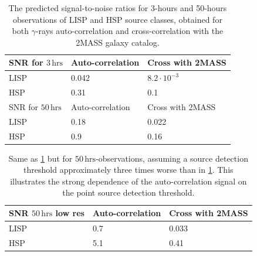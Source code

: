 \documentclass[aps,prd,a4paper,reprint,nofootinbib,superscriptaddress,floatfix,preprintnumbers]{revtex4-2}
\begin{document}
\begin{table}[t!]
\centering
\begin{tabular}{m{}  m{}  m{}} 
 \hline
 SNR for $3\,\mathrm{hrs}$ & Auto-correlation & Cross with 2MASS \\ [0.5ex]
 \hline
 LISP &  0.042 &   $8.2\cdot 10^{-3}$ \\ [0.5ex]
 HSP &  0.31 &  0.1 \\  [1.5ex]
 \hline \hline
  SNR for $50\,\mathrm{hrs}$ & Auto-correlation & Cross with 2MASS \\ [0.5ex]
 \hline
 LISP &  0.18 &  0.022 \\ [0.5ex]
 HSP &  0.9 &  0.16\\ [1ex]
 \hline
\end{tabular}
\caption{The predicted signal-to-noise ratios for 3-hours and 50-hours observations of LISP and HSP source classes, obtained for both $\gamma$-rays auto-correlation and cross-correlation with the 2MASS galaxy catalog. 
}
\label{table:SNR}
\end{table}

\begin{table}[t!]
\centering
\begin{tabular}{m{} m{} m{}} 
\hline
 SNR $50\,\mathrm{hrs}$ low res & Auto-correlation & Cross with 2MASS 
 \\ [0.5ex]
 \hline
 LISP &  0.7 &   0.033 \\ [0.5ex]
 HSP &  5.1 &  0.41 \\  [1ex]
 \hline
\end{tabular}
\caption{Same as \cref{table:SNR} but for $50\,\mathrm{hrs}$-observations, assuming a source detection threshold approximately three times worse than in \cref{table:SNR}. This illustrates the strong dependence of the auto-correlation signal on the point source detection threshold.}
\label{table:SNR-mix}
\end{table}
\end{document}
